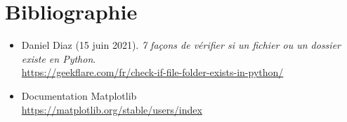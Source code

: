 \documentclass[titlepage]{article}
\begin{document}
\newpage
\section*{Bibliographie}

\begin{itemize}
\item Daniel Diaz (15 juin 2021). \textit{7 façons de vérifier si un fichier ou un dossier existe en Python}. \\ \url{https://geekflare.com/fr/check-if-file-folder-exists-in-python/}
\item Documentation Matplotlib \\ \url{https://matplotlib.org/stable/users/index}
\end{itemize}
\end{document}
